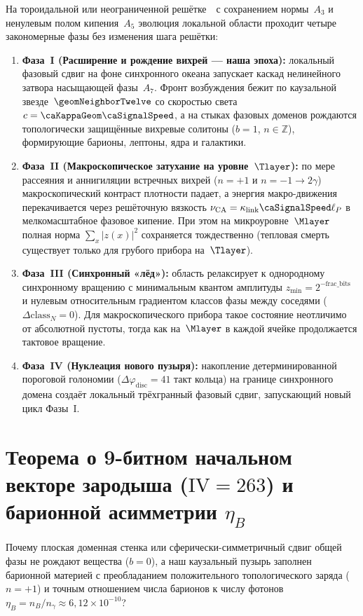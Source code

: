 На тороидальной или неограниченной решётке~\latGCK\ с сохранением нормы~$A_3$ и ненулевым полом кипения~$A_5$ эволюция локальной области проходит четыре закономерные фазы без изменения шага решётки:
\begin{enumerate}[leftmargin=*]
\item \textbf{Фаза~I (Расширение и рождение вихрей --- наша эпоха):}
  локальный фазовый сдвиг на фоне синхронного океана запускает каскад нелинейного затвора насыщающей фазы~$A_7$. Фронт возбуждения бежит по каузальной звезде~$\geomNeighborTwelve$ со скоростью света $c = \caKappaGeom\caSignalSpeed$, а на стыках фазовых доменов рождаются топологически защищённые вихревые солитоны ($b=1$, $n\in\mathbb{Z}$), формирующие барионы, лептоны, ядра и галактики.
\item \textbf{Фаза~II (Макроскопическое затухание на уровне~$\Tlayer$):}
  по мере рассеяния и аннигиляции встречных вихрей ($n=+1$ и $n=-1 \to 2\gamma$) макроскопический контраст плотности падает, а энергия макро-движения перекачивается через решёточную вязкость $\nu_{\mathrm{CA}} = \kappa_{\mathrm{link}}\caSignalSpeed\ell_P$ в мелкомасштабное фазовое кипение. При этом на микроуровне~$\Mlayer$ полная норма $\sum_x |z(x)|^2$ сохраняется тождественно (тепловая смерть существует только для грубого прибора на~$\Tlayer$).
\item \textbf{Фаза~III (Синхронный «лёд»):}
  область релаксирует к однородному синхронному вращению с минимальным квантом амплитуды $z_{\min} = 2^{-\mathrm{frac\_bits}}$ и нулевым относительным градиентом классов фазы между соседями ($\Delta\mathrm{class}_{N} = 0$). Для макроскопического прибора такое состояние неотличимо от абсолютной пустоты, тогда как на~$\Mlayer$ в каждой ячейке продолжается тактовое вращение.
\item \textbf{Фаза~IV (Нуклеация нового пузыря):}
  накопление детерминированной пороговой голономии ($\Delta\varphi_{\mathrm{disc}} = 41$ такт кольца) на границе синхронного домена создаёт локальный трёхгранный фазовый сдвиг, запускающий новый цикл Фазы~I.
\end{enumerate}

\section{Теорема о 9-битном начальном векторе зародыша (\texorpdfstring{$\mathrm{IV}=263$}{IV=263}) и барионной асимметрии \texorpdfstring{$\eta_B$}{eta\_B}}
\label{sec:cosmo-9bit-theorem}

Почему плоская доменная стенка или сферически-симметричный сдвиг общей фазы не рождают вещества ($b=0$), а наш каузальный пузырь заполнен барионной материей с преобладанием положительного топологического заряда ($n=+1$) и точным отношением числа барионов к числу фотонов $\eta_B = n_B/n_\gamma \approx 6{,}12\times 10^{-10}$?

